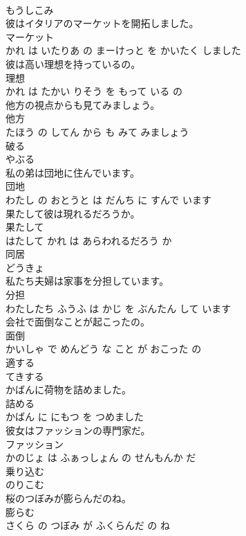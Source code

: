 \documentclass[8pt]{extreport}
\begin{document}
\begin{CJK}{UTF8}{min}
\\	もうしこみ			
\\	彼はイタリアのマーケットを開拓しました。	
\\	マーケット 
\\	かれ は いたりあ の まーけっと を かいたく しました			
\\	彼は高い理想を持っているの。	
\\	理想 
\\	かれ は たかい りそう を もって いる の			
\\	他方の視点からも見てみましょう。	
\\	他方 
\\	たほう の してん から も みて みましょう			
\\	破る	
\\	やぶる			
\\	私の弟は団地に住んでいます。	
\\	団地 
\\	わたし の おとうと は だんち に すんで います			
\\	果たして彼は現れるだろうか。	
\\	果たして 
\\	はたして かれ は あらわれるだろう か			
\\	同居	
\\	どうきょ			
\\	私たち夫婦は家事を分担しています。	
\\	分担 
\\	わたしたち ふうふ は かじ を ぶんたん して います			
\\	会社で面倒なことが起こったの。	
\\	面倒 
\\	かいしゃ で めんどう な こと が おこった の			
\\	適する	
\\	てきする			
\\	かばんに荷物を詰めました。	
\\	詰める 
\\	かばん に にもつ を つめました			
\\	彼女はファッションの専門家だ。	
\\	ファッション 
\\	かのじょ は ふぁっしょん の せんもんか だ			
\\	乗り込む	
\\	のりこむ			
\\	桜のつぼみが膨らんだのね。	
\\	膨らむ 
\\	さくら の つぼみ が ふくらんだ の ね			

\end{CJK}
\end{document}
